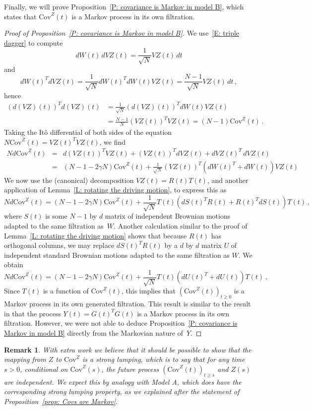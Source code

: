 \documentclass[12pt]{article}
\newtheorem{remark}{Remark}
\newcommand{\1}{\mathbf{1}}
\begin{document}
Finally, we will prove Proposition~\ref{P: covariance is Markov in model B}, which states that $\mathrm{Cov}^Z(t)$ is a Markov process in its own filtration.
\begin{proof}[Proof of Proposition~\ref{P: covariance is Markov in model B}]
We use~\eqref{E: triple dagger} to compute 
$$ dW(t)\,dVZ(t) = \frac{1}{\sqrt{N}} VZ(t) \,dt$$ and
$$ dW(t)^T dVZ(t) = \frac{1}{\sqrt{N}} dW(t)^T dW(t) VZ(t) = \frac{N-1}{\sqrt{N}}VZ(t)\,dt\,,$$
hence
\begin{align*}
(d(VZ)(t))^T d(VZ)(t) &= \frac{1}{\sqrt{N}}(d(VZ)(t))^T dW(t) VZ(t) 
\\& = \frac{N-1}{N} (VZ(t))^T VZ(t) = (N-1)\mathrm{Cov}^Z(t)\,.
\end{align*}
Taking the It\^{o} differential of both sides of the equation $N\mathrm{Cov}^Z(t) = VZ(t)^T VZ(t)$, we find
\begin{eqnarray*} N d \mathrm{Cov}^Z(t) & = & d(VZ(t))^T VZ(t) + (VZ(t))^T dVZ(t) + dVZ(t)^T \,dVZ(t)\\
& = & (N-1 -2\gamma N) \mathrm{Cov}^Z(t) + \frac{1}{\sqrt{N}} (VZ(t))^T(dW(t)^T + dW(t))VZ(t) 
\end{eqnarray*}
We now use the (canonical) decomposition  $VZ(t) = R(t)T(t)$, and another application of Lemma~\ref{L: rotating the driving motion}, to express this as
$$N d\mathrm{Cov}^Z(t) = (N-1 - 2\gamma N)\mathrm{Cov}^Z(t) + \frac{1}{\sqrt{N}} T(t) (dS(t)^T R(t) + R(t)^TdS(t))T(t)\,, $$
where $S(t)$ is some $N-1$ by $d$ matrix of independent Brownian motions adapted to the same filtration as~$W$. Another calculation similar to the proof of Lemma~\ref{L: rotating the driving motion} shows that because $R(t)$ has orthogonal columns, we may replace $dS(t)^TR(t)$ by a $d$ by $d$ matrix $U$ of independent standard Brownian motions adapted to the same filtration as $W$. We obtain
$$N d\mathrm{Cov}^Z(t) = (N-1 - 2\gamma N)\mathrm{Cov}^Z(t) + \frac{1}{\sqrt{N}} T(t) (dU(t)^T + dU(t))T(t)\,, $$
Since $T(t)$ is a function of $\mathrm{Cov}^Z(t)$, this implies that $\left(\mathrm{Cov}^Z(t)\right)_{t \ge 0}$ is a Markov process in its own generated filtration. This result is similar to the result in \cite{NRW} that the process $Y(t) = G(t)^T G(t)$ is a Markov process in its own filtration. However, we were not able to deduce Proposition~\ref{P: covariance is Markov in model B} directly from the Markovian nature of~$Y$.
\end{proof}
\begin{remark} With extra work we believe that it should be possible to show that the mapping from $Z$ to $\mathrm{Cov}^Z$ is a strong lumping, which is to say that for any time $s > 0$, conditional on $\mathrm{Cov}^Z(s)$, the future process $\left(\mathrm{Cov}^Z(t)\right)_{t \ge s}$ and $Z(s)$ are independent. {We expect this by analogy with Model A, which does have the corresponding strong lumping property, as we explained after the statement of Proposition~\ref{prop: Covs are Markov}.}
\end{remark}
\end{document}
